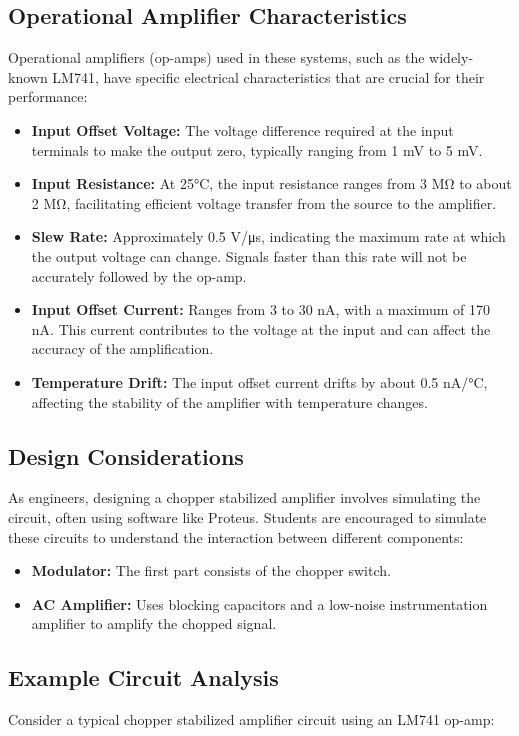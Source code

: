 \subsection{Operational Amplifier Characteristics}
Operational amplifiers (op-amps) used in these systems, such as the widely-known LM741, have specific electrical characteristics that are crucial for their performance:
\begin{itemize}
    \item \textbf{Input Offset Voltage:} The voltage difference required at the input terminals to make the output zero, typically ranging from 1 mV to 5 mV.
    \item \textbf{Input Resistance:} At 25°C, the input resistance ranges from 3 MΩ to about 2 MΩ, facilitating efficient voltage transfer from the source to the amplifier.
    \item \textbf{Slew Rate:} Approximately 0.5 V/μs, indicating the maximum rate at which the output voltage can change. Signals faster than this rate will not be accurately followed by the op-amp.
    \item \textbf{Input Offset Current:} Ranges from 3 to 30 nA, with a maximum of 170 nA. This current contributes to the voltage at the input and can affect the accuracy of the amplification.
    \item \textbf{Temperature Drift:} The input offset current drifts by about 0.5 nA/°C, affecting the stability of the amplifier with temperature changes.
\end{itemize}

\subsection{Design Considerations}
As engineers, designing a chopper stabilized amplifier involves simulating the circuit, often using software like Proteus. Students are encouraged to simulate these circuits to understand the interaction between different components:

\begin{itemize}
    \item \textbf{Modulator:} The first part consists of the chopper switch.
    \item \textbf{AC Amplifier:} Uses blocking capacitors and a low-noise instrumentation amplifier to amplify the chopped signal.
\end{itemize}

\subsection{Example Circuit Analysis}
Consider a typical chopper stabilized amplifier circuit using an LM741 op-amp:

